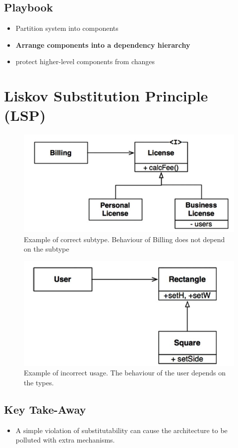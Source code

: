 \documentclass[../Main.tex]{subfiles}
\begin{document}
\subsection{Playbook}
\begin{itemize}
    \item Partition system into components
    \item \textbf{Arrange components into a dependency hierarchy}
    \item protect higher-level components from changes
\end{itemize}

\section{Liskov Substitution Principle (LSP)}
\begin{figure}[H]
    \centering
    \includegraphics[width=0.75\linewidth]{Images/cleanarch/lsp-example.png}
    \caption{Example of correct subtype. Behaviour of Billing does not depend on the subtype}
\end{figure}
\begin{figure}[H]
    \centering
    \includegraphics[width=0.75\linewidth]{Images/cleanarch/lsp-wrong-example.png}
    \caption{Example of incorrect usage. The behaviour of the user depends on the types.}
\end{figure}

\subsection{Key Take-Away}
\begin{itemize}
    \item A simple violation of substitutability can cause the architecture to be polluted with extra mechanisms.
\end{itemize}
\end{document}
